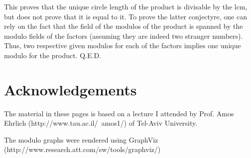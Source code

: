\documentclass[a4paper]{report}
\begin{document}
This proves that the unique circle length of the product is divisable by the
lcm, but does not prove that it is equal to it. To prove the latter
conjectyre, one can rely on the fact that the field of the modulos of 
the product is spanned by the modulo fields of the factors (assuming 
they are indeed two stranger numbers). Thus, two respective given 
modulos for each of the factors implies one unique modulo for the 
product. Q.E.D.

\section{Acknowledgements}

The material in these pages is based on a lecture I attended by
Prof. Amos Ehrlich (http://www.tau.ac.il/~amos1/) of Tel-Aviv University.

The modulo graphs were rendered using GraphViz 
(http://www.research.att.com/sw/tools/graphviz/)
\end{document}
